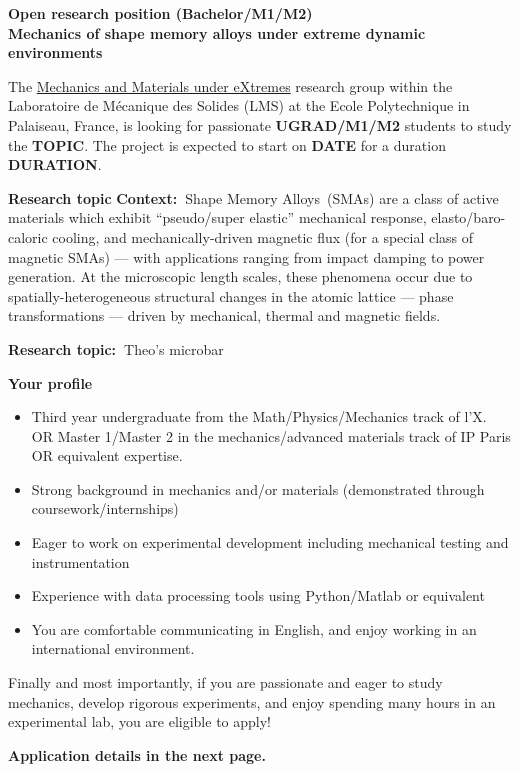 \documentclass[a4paper,11pt,fleqn]{article}
\begin{document}
	\setlength{\abovedisplayskip}{2 pt}
	\setlength{\belowdisplayskip}{2 pt}
	\sffamily
	\thispagestyle{titlepage}
	\begin{center}
		\vspace*{0em}
		\Large \textbf{Open research position (Bachelor/M1/M2) \\ Mechanics of shape memory alloys under extreme dynamic environments} 
	\end{center}
	
	The \href{https://vigneshkannan-group.github.io/vk-mxm-website/}{Mechanics and Materials under eXtremes} research group within the Laboratoire de M{\'e}canique des Solides (LMS) at the Ecole Polytechnique in Palaiseau, France, is looking for passionate \textbf{UGRAD/M1/M2} students to study the \textbf{TOPIC}. The project is expected to start on \textbf{DATE} for a duration \textbf{DURATION}.

	\begin{myhlbox}{\textbf{Research topic}}
		\textbf{Context:~}Shape Memory Alloys~(SMAs) are a class of active materials which exhibit ``pseudo/super elastic'' mechanical response, elasto/baro-caloric cooling, and mechanically-driven magnetic flux (for a special class of magnetic SMAs) --- with applications ranging from impact damping to power generation. At the microscopic length scales, these phenomena occur due to spatially-heterogeneous structural changes in the atomic lattice --- phase transformations --- driven by mechanical, thermal and magnetic fields. 
		
		\textbf{Research topic:~}Theo's microbar
	
	\end{myhlbox}
	
	\begin{myhlbox}{\textbf{Your profile}}
		\begin{itemize}[leftmargin=*, itemsep=-0.25em]
			\item Third year undergraduate from the Math/Physics/Mechanics track of l'X. OR Master 1/Master 2 in the mechanics/advanced materials track of IP Paris OR equivalent expertise. 
			\item Strong background in mechanics and/or materials (demonstrated through coursework/internships)
			\item Eager to work on experimental development including mechanical testing and instrumentation
			\item Experience with data processing tools using Python/Matlab or equivalent 
			\item You are comfortable communicating in English, and enjoy working in an international environment. 
		\end{itemize}
		\vspace{0em}
		Finally and most importantly, if you are passionate and eager to study mechanics, develop rigorous experiments, and enjoy spending many hours in an experimental lab, you are eligible to apply! \begin{center}
			\textbf{Application details in the next page.}
		\end{center}
	\end{myhlbox}
	
\end{document}
